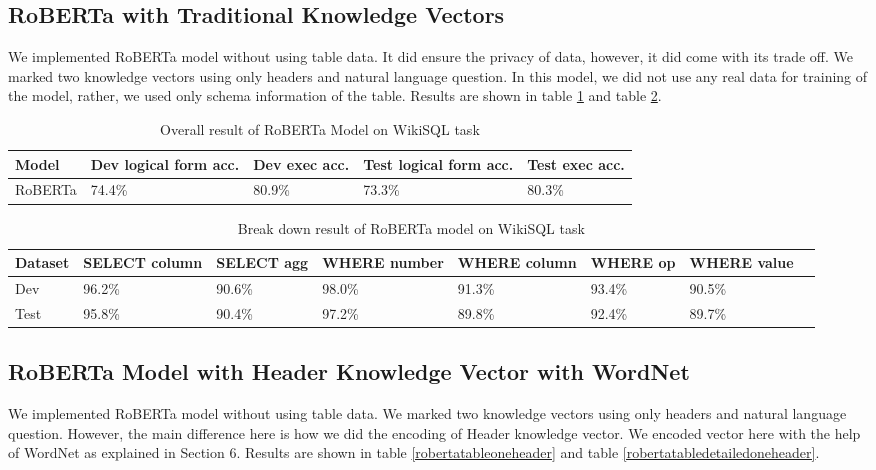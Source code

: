 \documentclass[12pt]{article}
\begin{document}
 


\subsection{RoBERTa with Traditional Knowledge Vectors}

We implemented RoBERTa model without using table data. It did ensure the privacy of data, however, it did come with its trade off. We marked two knowledge vectors using only headers and natural language question. In this model, we did not use any real data for training of the model, rather, we used only schema information of the table. Results are shown in table \ref{robertatable} and table \ref{robertatabledetailed}.

 \begin{table}
\centering
 \begin{tabular}{| m{2cm} | m{2cm}| m{2cm} |m{2cm}| m{2cm} |} 
 \hline
Model & Dev logical form acc. & Dev exec acc. & Test logical form acc. & Test exec acc. \\ 
 \hline\hline
  RoBERTa & 74.4\% & 80.9\% & 73.3\% & 80.3\% \\ 
 \hline
\end{tabular}
\caption{Overall result of RoBERTa Model on WikiSQL task}
\label{robertatable}
\end{table}


\begin{table}
\centering
 \begin{tabular}{| m{2cm} | m{2cm}| m{2cm} |m{2cm}| m{2cm} |m{2cm} | m{2cm} |m{2cm} |} 
 \hline
  Dataset & SELECT column & SELECT agg & WHERE number & WHERE column & WHERE op & WHERE value\\ 
 \hline\hline
  Dev & 96.2\% & 90.6\% & 98.0\% & 91.3\% & 93.4\% &  90.5\% \\ 
\hline
 Test & 95.8\% & 90.4\% & 97.2\% & 89.8\% & 92.4\% &  89.7\% \\ 
 \hline

\end{tabular}
\caption{Break down result of RoBERTa model on WikiSQL task}
\label{robertatabledetailed}
\end{table}

\subsection{RoBERTa Model with Header Knowledge Vector with WordNet}

We implemented RoBERTa model without using table data. We marked two knowledge vectors using only headers and natural language question. However, the main difference here is how we did the  encoding of Header knowledge vector. We encoded vector here with the help of WordNet as explained in Section 6. Results are shown in table \ref{robertatableoneheader} and table \ref{robertatabledetailedoneheader}.
\end{document}

